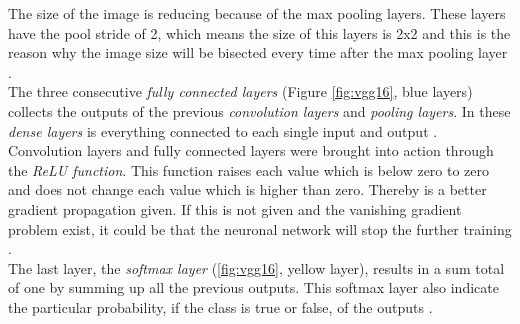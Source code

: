 The size of the image is reducing because of the max pooling layers. These layers have the pool stride of 2, which means the size of this layers is 2x2 and this is the reason why the image size will be bisected every time after the max pooling layer \cite{Hassan2018}.\\
The three consecutive \textit{fully connected layers} (Figure \ref{fig:vgg16}, blue layers) collects the outputs of the previous \textit{convolution layers} and \textit{pooling layers}. In these \textit{dense layers} is everything connected to each single input and output \cite{Becker2019}.\\
Convolution layers and fully connected layers were brought into action through the \textit{ReLU function}. This function raises each value which is below zero to zero and does not change each value which is higher than zero. Thereby is a better gradient propagation given. If this is not given and the vanishing gradient problem exist, it could be that the neuronal network will stop the further training \cite{Becker2019}.\\
The last layer, the \textit{softmax layer} (\ref{fig:vgg16}, yellow layer), results in a sum total of one by summing up all the previous outputs. This softmax layer also indicate the particular probability, if the class is true or false, of the outputs \cite{Becker2019}.


